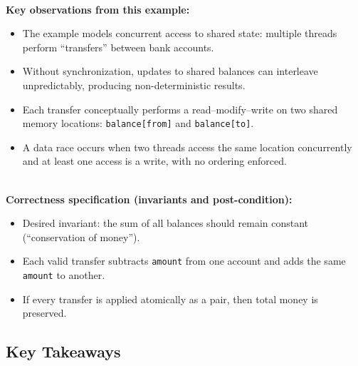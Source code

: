 \begin{ppnote}
\textbf{\\ Key observations from this example:}
\begin{itemize}
    \item The example models concurrent access to shared state: multiple threads perform ``transfers'' between bank accounts.
    \item Without synchronization, updates to shared balances can interleave unpredictably, producing non-deterministic results.
    \item Each transfer conceptually performs a read--modify--write on two shared memory locations: \texttt{balance[from]} and \texttt{balance[to]}.
    \item A data race occurs when two threads access the same location concurrently and at least one access is a write, with no ordering enforced.
\end{itemize}
\end{ppnote}

\begin{ppkey}
\textbf{\\ Correctness specification (invariants and post-condition):}
\begin{itemize}
    \item Desired invariant: the sum of all balances should remain constant (``conservation of money'').
    \item Each valid transfer subtracts \texttt{amount} from one account and adds the same \texttt{amount} to another.
    \item If every transfer is applied atomically as a pair, then total money is preserved.
\end{itemize}
\end{ppkey}


\subsection{Key Takeaways}

